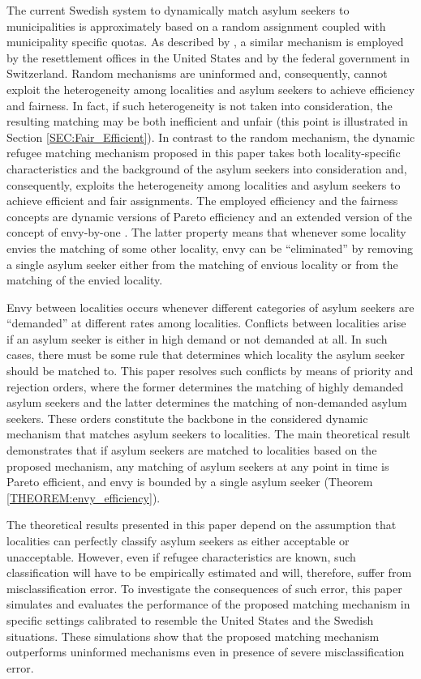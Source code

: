 \documentclass[12pt,fleqn]{article}
\begin{document}
The current Swedish system to dynamically match asylum seekers to municipalities is approximately based on a random assignment coupled with municipality specific quotas. As described by \citet[][p.325]{bib:BansakEtAl}, a similar mechanism is employed by the resettlement offices in the United States and by the federal government in Switzerland. Random mechanisms are uninformed and, consequently, cannot exploit the heterogeneity among localities and asylum seekers to achieve efficiency and fairness. In fact, if such heterogeneity is not taken into consideration, the resulting matching may be both inefficient and unfair (this point is illustrated in Section \ref{SEC:Fair_Efficient}). In contrast to the random mechanism, the dynamic refugee matching mechanism proposed in this paper takes both locality-specific characteristics and the background of the asylum seekers into consideration and, consequently, exploits the heterogeneity among localities and asylum seekers to achieve efficient and fair assignments. The employed efficiency and the fairness concepts are dynamic versions of Pareto efficiency and an extended version of the concept of envy-by-one \citep{bib:Budish}. The latter property means that whenever some locality envies the matching of some other locality, envy can be ``eliminated'' by removing a single asylum seeker either from the matching of envious locality or from the matching of the envied locality.

Envy between localities occurs whenever different categories of asylum seekers are ``demanded'' at different rates among localities. Conflicts between localities arise if an asylum seeker is either in high demand or not demanded at all. In such cases, there must be some rule that determines which locality the asylum seeker should be matched to. This paper resolves such conflicts by means of priority and rejection orders, where the former determines the matching of highly demanded asylum seekers and the latter determines the matching of non-demanded asylum seekers. These orders constitute the backbone in the considered dynamic mechanism that matches asylum seekers to localities. The main theoretical result demonstrates that if asylum seekers are matched to localities based on the proposed mechanism, any matching of asylum seekers at any point in time is Pareto efficient, and envy is bounded by a single asylum seeker (Theorem \ref{THEOREM:envy_efficiency}).

The theoretical results presented in this paper depend on the assumption that localities can perfectly classify asylum seekers as either acceptable or unacceptable. However, even if refugee characteristics are known, such classification will have to be empirically estimated and will, therefore, suffer from misclassification error. To investigate the consequences of such error, this paper simulates and evaluates the performance of the proposed matching mechanism in specific settings calibrated to resemble the United States and the Swedish situations. These simulations show that the proposed matching mechanism outperforms uninformed mechanisms even in presence of severe misclassification error.
\end{document}
